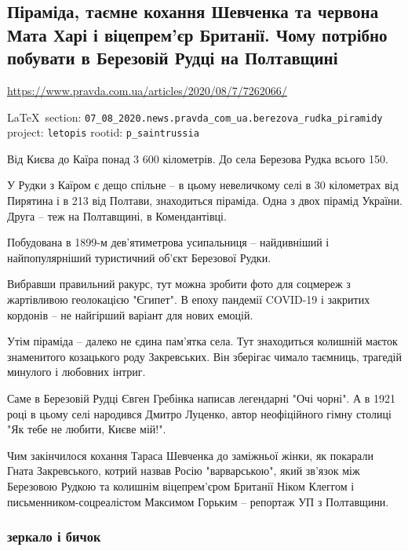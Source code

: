  
 
\subsection{Піраміда, таємне кохання Шевченка та червона Мата Харі і віцепрем'єр Британії. Чому потрібно побувати в Березовій Рудці на Полтавщині}
\url{https://www.pravda.com.ua/articles/2020/08/7/7262066/}
  
\vspace{0.5cm}
 {\ifDEBUG\small\LaTeX~section: \verb|07_08_2020.news.pravda_com_ua.berezova_rudka_piramidy| project: \verb|letopis| rootid: \verb|p_saintrussia| \fi}
\vspace{0.5cm}

Від Києва до Каїра понад 3 600 кілометрів. До села Березова Рудка всього 150.

У Рудки з Каїром є дещо спільне – в цьому невеличкому селі в 30 кілометрах від
Пирятина і в 213 від Полтави, знаходиться піраміда. Одна з двох пірамід
України. Друга – теж на Полтавщині, в Комендантівці.

Побудована в 1899-м дев'ятиметрова усипальниця – найдивніший і найпопулярніший
туристичний об'єкт Березової Рудки.

Вибравши правильний ракурс, тут можна зробити фото для соцмереж з жартівливою
геолокацією "Єгипет". В епоху пандемії COVID-19 і закритих кордонів – не
найгірший варіант для нових емоцій.

Утім піраміда – далеко не єдина пам'ятка села. Тут знаходиться колишній маєток
знаменитого козацького роду Закревських. Він зберігає чимало таємниць, трагедій
минулого і любовних інтриг.

Саме в Березовій Рудці Євген Гребінка написав легендарні "Очі чорні". А в 1921
році в цьому селі народився Дмитро Луценко, автор неофіційного гімну столиці
"Як тебе не любити, Києве мій!".

Чим закінчилося кохання Тараса Шевченка до заміжньої жінки, як покарали Гната
Закревського, котрий назвав Росію "варварською", який зв'язок між Березовою
Рудкою та колишнім віцепрем'єром Британії Ніком Клеггом і
письменником-соцреалістом Максимом Горьким – репортаж УП з Полтавщини.

\subsubsection{зеркало і бичок}


